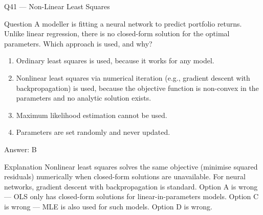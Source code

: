 \documentclass[aspectratio=169,8pt]{beamer}
\begin{document}
	
	\begin{frame}{Q41 --- Non-Linear Least Squares}
		\begin{block}{Question}
			A modeller is fitting a neural network to predict portfolio returns. Unlike linear regression, there is no closed-form solution for the optimal parameters. Which approach is used, and why?
		\end{block}
		\begin{enumerate}
			\item Ordinary least squares is used, because it works for any model.
			\item Nonlinear least squares via numerical iteration (e.g., gradient descent with backpropagation) is used, because the objective function is non-convex in the parameters and no analytic solution exists.
			\item Maximum likelihood estimation cannot be used.
			\item Parameters are set randomly and never updated.
		\end{enumerate}
		\begin{exampleblock}{Answer: B}\end{exampleblock}
		\begin{block}{Explanation}
			Nonlinear least squares solves the same objective (minimise squared residuals) numerically when closed-form solutions are unavailable. For neural networks, gradient descent with backpropagation is standard. Option A is wrong --- OLS only has closed-form solutions for linear-in-parameters models. Option C is wrong --- MLE is also used for such models. Option D is wrong.
		\end{block}
	\end{frame}
	
\end{document}
